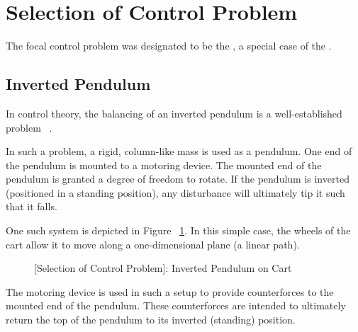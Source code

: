 \documentclass[crop=false,float=true,class=scrreprt]{standalone}
\begin{document}
\section{Selection of Control Problem}
\label{SEC:preliminaryDecisions:selectionControlProblem}

The focal control problem was designated to be the , 
a special case of the .




\subsection{Inverted Pendulum}
\label{SEC:preliminaryDecisions:selectionControlProblem:invertedPendulum}

In control theory, the balancing of an inverted pendulum is a well-established problem~%
\cite{REF:textbook:1995-vaccaro}.

In such a problem, a rigid, column-like mass is used as a pendulum.
One end of the pendulum is mounted to a motoring device.
The mounted end of the pendulum is granted a degree of freedom to rotate.
If the pendulum is inverted {\fns(positioned in a standing position)},
any disturbance will ultimately tip it such that it falls.

One such system is depicted in Figure~%
\ref{FIG:preliminaryDecisions:selectionControlProblem:invertedPendulum}.
In this simple case, the wheels of the cart allow it to move along a one-dimensional plane {\fns(a linear path)}.  

\vspace*{\fill}
\begin{figure}[H]%
\centering%
%
\caption[{[Selection of Control Problem]: Inverted Pendulum on Cart}]%
        {{[Selection of Control Problem]: Inverted Pendulum on Cart~%
          \cite{REF:online:wikipedia:invertedPendulum:physicalModel}%
          \label{FIG:preliminaryDecisions:selectionControlProblem:invertedPendulum}%
        }}%
\end{figure}
\vspace*{\fill}




\clearpage




The motoring device is used in such a setup to provide counterforces to the mounted end of the pendulum.
These counterforces are intended to ultimately return the top of the pendulum to its inverted {\fns(standing)} position.
\end{document}
